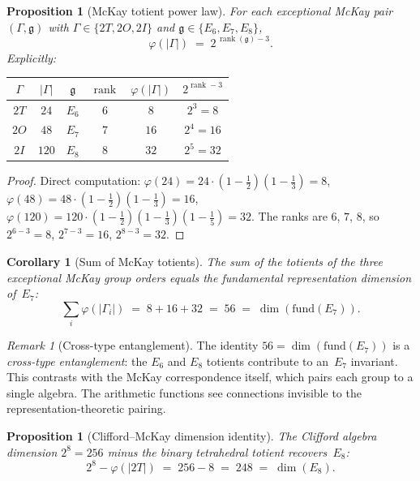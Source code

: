 \documentclass[11pt]{amsart}
\theoremstyle{plain}
\newtheorem{proposition}[theorem]{Proposition}
\newtheorem{corollary}[theorem]{Corollary}
\theoremstyle{definition}
\theoremstyle{remark}
\newtheorem{remark}[theorem]{Remark}
\newcommand{\fg}{\mathfrak{g}}
\newcommand{\rank}{\operatorname{rank}}
\begin{document}
\begin{proposition}[McKay totient power law]\label{prop:mckay-totient}
For each exceptional McKay pair $(\Gamma, \fg)$ with
$\Gamma \in \{2T, 2O, 2I\}$ and $\fg \in \{E_6, E_7, E_8\}$,
\[
  \varphi(|\Gamma|) \;=\; 2^{\,\rank(\fg) - 3}.
\]
Explicitly:
\begin{center}
\renewcommand{\arraystretch}{1.15}
\begin{tabular}{cccccc}
\toprule
$\Gamma$ & $|\Gamma|$ & $\fg$ & $\rank$ & $\varphi(|\Gamma|)$ & $2^{\rank - 3}$ \\
\midrule
$2T$ & $24$ & $E_6$ & $6$ & $8$  & $2^3 = 8$  \\
$2O$ & $48$ & $E_7$ & $7$ & $16$ & $2^4 = 16$ \\
$2I$ & $120$ & $E_8$ & $8$ & $32$ & $2^5 = 32$ \\
\bottomrule
\end{tabular}
\end{center}
\end{proposition}

\begin{proof}
Direct computation:
$\varphi(24) = 24 \cdot (1 - \tfrac{1}{2})(1 - \tfrac{1}{3}) = 8$,
$\varphi(48) = 48 \cdot (1 - \tfrac{1}{2})(1 - \tfrac{1}{3}) = 16$,
$\varphi(120) = 120 \cdot (1-\tfrac{1}{2})(1-\tfrac{1}{3})(1-\tfrac{1}{5}) = 32$.
The ranks are $6$, $7$, $8$, so $2^{6-3} = 8$, $2^{7-3} = 16$,
$2^{8-3} = 32$.
\end{proof}

\begin{corollary}[Sum of McKay totients]\label{cor:mckay-sum}
The sum of the totients of the three exceptional McKay group orders
equals the fundamental representation dimension of~$E_7$:
\[
  \sum_{i} \varphi(|\Gamma_i|) \;=\;
  8 + 16 + 32 \;=\; 56 \;=\; \dim(\mathrm{fund}(E_7)).
\]
\end{corollary}

\begin{remark}[Cross-type entanglement]
The identity $56 = \dim(\mathrm{fund}(E_7))$ is a \emph{cross-type
entanglement}: the $E_6$ and $E_8$ totients contribute to an~$E_7$
invariant.  This contrasts with the McKay correspondence itself, which
pairs each group to a single algebra.  The arithmetic functions see
connections invisible to the representation-theoretic pairing.
\end{remark}

\begin{proposition}[Clifford--McKay dimension identity]%
\label{prop:clifford-mckay}
The Clifford algebra dimension $2^8 = 256$ minus the binary
tetrahedral totient recovers~$E_8$:
\[
  2^8 - \varphi(|2T|) \;=\; 256 - 8 \;=\; 248 \;=\; \dim(E_8).
\]
\end{proposition}
\end{document}
